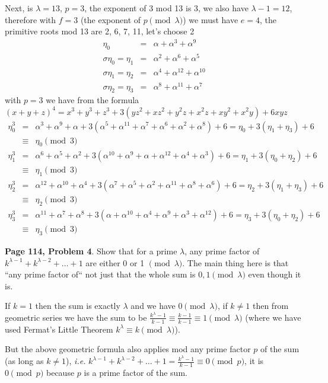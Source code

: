 \documentclass[aps,preprint,preprintnumbers,nofootinbib,showpacs,prd]{revtex4-1}
\newcommand{\ie}{{\it i.e.} }
\newcommand{\nbea}{\begin{eqnarray*}}
\newcommand{\neea}{\end{eqnarray*}}
\begin{document}
Next, is $\lambda=13$, $p=3$, the exponent of 3 mod 13 is 3, we also have $\lambda - 1 = 12$, therefore with $f = 3$ (the exponent of $p \pmod{\lambda}$) we must have $e = 4$, the primitive roots mod 13 are 2, 6, 7, 11, let's choose 2
%
\nbea
\eta_0 & = & \alpha + \alpha^{3} + \alpha^{9} \\
\sigma\eta_0 = \eta_1 & = & \alpha^2 + \alpha^{6} + \alpha^{5} \\
\sigma\eta_1 = \eta_2 & = & \alpha^4 + \alpha^{12} + \alpha^{10} \\
\sigma\eta_2 = \eta_3 & = & \alpha^{8} + \alpha^{11} + \alpha^{7}
\neea
%
with $p = 3$ we have from the formula $(x + y + z)^4 = x^3+y^3+z^3+3(yz^2+xz^2+y^2z+x^2z+xy^2+x^2y) +6xyz$
%
\nbea
\eta_0^3 & = & \alpha^3 + \alpha^9 + \alpha + 3(\alpha^5 + \alpha^{11} + \alpha^{7} + \alpha^6 + \alpha^2 + \alpha^8) + 6 = \eta_0 + 3(\eta_1 + \eta_3) + 6 \\
& \equiv & \eta_0 \pmod{3} \\
\eta_1^3 & = & \alpha^6 + \alpha^5 + \alpha^2 + 3(\alpha^{10} + \alpha^{9} + \alpha + \alpha^{12} + \alpha^{4} + \alpha^{3}) + 6 = \eta_1 + 3(\eta_0 + \eta_2) + 6 \\
& \equiv & \eta_1 \pmod{3} \\
\eta_2^3 & = & \alpha^{12} + \alpha^{10} + \alpha^4 + 3(\alpha^{7} + \alpha^{5} + \alpha^{2} + \alpha^{11} + \alpha^{8} + \alpha^{6}) + 6 = \eta_2 + 3(\eta_1 + \eta_3) + 6 \\
& \equiv & \eta_2 \pmod{3} \\
\eta_3^3 & = & \alpha^{11} + \alpha^{7} + \alpha^{8} + 3(\alpha + \alpha^{10} + \alpha^{4} + \alpha^{9} + \alpha^{3} + \alpha^{12}) + 6  = \eta_3 + 3(\eta_0 + \eta_2) + 6 \\
& \equiv & \eta_3 \pmod{3}
\neea
%

{\bf Page 114, Problem 4}. Show that for a prime $\lambda$, any prime factor of $k^{\lambda - 1} + k^{\lambda - 2} + \dots + 1$ are either 0 or 1 $\pmod{\lambda}$. The main thing here is that ``any prime factor of`` not just that the whole sum is $0,1 \pmod{\lambda}$ even though it is.

If $k = 1$ then the sum is exactly $\lambda$ and we have $0 \pmod{\lambda}$, if $k \neq 1$ then from geometric series we have the sum to be $\frac{k^{\lambda} - 1}{k - 1} \equiv \frac{k - 1}{k - 1} \equiv 1 \pmod{\lambda}$ (where we have used Fermat's Little Theorem $k^\lambda \equiv k \pmod{\lambda}$).

But the above geometric formula also applies mod any prime factor $p$ of the sum (as long as $k \neq 1$), \ie $k^{\lambda - 1} + k^{\lambda - 2} + \dots + 1 = \frac{k^{\lambda} - 1}{k - 1} \equiv 0 \pmod{p}$, it is $0 \pmod{p}$ because $p$ is a prime factor of the sum.
\end{document}
